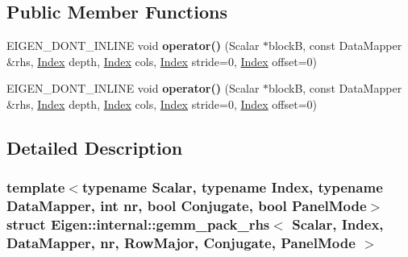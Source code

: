 \subsection*{Public Member Functions}
\begin{DoxyCompactItemize}
\item 
\mbox{\label{struct_eigen_1_1internal_1_1gemm__pack__rhs_3_01_scalar_00_01_index_00_01_data_mapper_00_01nr_00b7f2442d9ba6129104d4662213736528_a1ff23e11b13421a4c2649dcd6b0ae951}} 
E\+I\+G\+E\+N\+\_\+\+D\+O\+N\+T\+\_\+\+I\+N\+L\+I\+NE void {\bfseries operator()} (Scalar $\ast$blockB, const Data\+Mapper \&rhs, \hyperlink{namespace_eigen_a62e77e0933482dafde8fe197d9a2cfde}{Index} depth, \hyperlink{namespace_eigen_a62e77e0933482dafde8fe197d9a2cfde}{Index} cols, \hyperlink{namespace_eigen_a62e77e0933482dafde8fe197d9a2cfde}{Index} stride=0, \hyperlink{namespace_eigen_a62e77e0933482dafde8fe197d9a2cfde}{Index} offset=0)
\item 
\mbox{\label{struct_eigen_1_1internal_1_1gemm__pack__rhs_3_01_scalar_00_01_index_00_01_data_mapper_00_01nr_00b7f2442d9ba6129104d4662213736528_a1ff23e11b13421a4c2649dcd6b0ae951}} 
E\+I\+G\+E\+N\+\_\+\+D\+O\+N\+T\+\_\+\+I\+N\+L\+I\+NE void {\bfseries operator()} (Scalar $\ast$blockB, const Data\+Mapper \&rhs, \hyperlink{namespace_eigen_a62e77e0933482dafde8fe197d9a2cfde}{Index} depth, \hyperlink{namespace_eigen_a62e77e0933482dafde8fe197d9a2cfde}{Index} cols, \hyperlink{namespace_eigen_a62e77e0933482dafde8fe197d9a2cfde}{Index} stride=0, \hyperlink{namespace_eigen_a62e77e0933482dafde8fe197d9a2cfde}{Index} offset=0)
\end{DoxyCompactItemize}


\subsection{Detailed Description}
\subsubsection*{template$<$typename Scalar, typename Index, typename Data\+Mapper, int nr, bool Conjugate, bool Panel\+Mode$>$\newline
struct Eigen\+::internal\+::gemm\+\_\+pack\+\_\+rhs$<$ Scalar, Index, Data\+Mapper, nr, Row\+Major, Conjugate, Panel\+Mode $>$}




